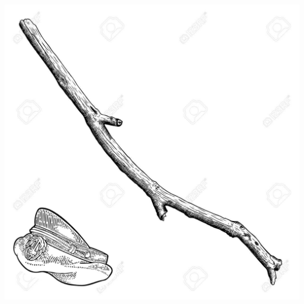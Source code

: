 \begin{center}
\includegraphics[width=\textwidth]{./content/img/xxx.jpg}
\begin{figure}[h]
\end{figure}
\end{center}

\clearpage